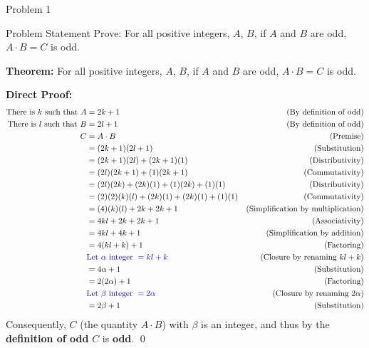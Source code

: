 \begin{problem}{Problem 1}
    \begin{statement}{Problem Statement}
        Prove: For all positive integers, $A$, $B$, if $A$ and $B$ are odd, $A \cdot B = C$ is odd.
    \end{statement}

    \begin{highlight}[Solution]
        \textbf{Theorem:} For all positive integers, $A$, $B$, if $A$ and $B$ are odd, $A \cdot B = C$ is odd. \vspace*{1em}

        \textbf{Direct Proof:} \newline
        \begin{align*}
            \text{There is $k$ such that } A & = 2k + 1 & \text{(By definition of odd)} \\
            \text{There is $l$ such that } B & = 2l + 1 & \text{(By definition of odd)} \\
            C & = A \cdot B & \text{(Premise)} \\
            & = (2k + 1)(2l + 1) & \text{(Substitution)} \\
            & = (2k + 1)(2l) + (2k + 1)(1) & \text{(Distributivity)} \\
            & = (2l)(2k + 1) + (1)(2k + 1) & \text{(Commutativity)} \\
            & = (2l)(2k) + (2k)(1) + (1)(2k) + (1)(1) & \text{(Distributivity)} \\
            & = (2)(2)(k)(l) + (2k)(1) + (2k)(1) + (1)(1) & \text{(Commutativity)} \\
            & = (4)(k)(l) + 2k + 2k + 1 & \text{(Simplification by multiplication)} \\
            & = 4kl + 2k + 2k + 1 & \text{(Associativity)} \\
            & = 4kl + 4k + 1 & \text{(Simplification by addition)} \\
            & = 4(kl + k) + 1 & \text{(Factoring)} \\
            & \textcolor{blue}{\text{Let } \alpha \text{ integer } = kl + k} & \text{(Closure by renaming $kl + k$)} \\
            & = 4\alpha + 1 & \text{(Substitution)} \\
            & = 2(2\alpha) + 1 & \text{(Factoring)} \\
            & \textcolor{blue}{\text{Let } \beta \text{ integer } = 2\alpha} & \text{(Closure by renaming $2\alpha$)} \\
            & = 2\beta + 1 & \text{(Substitution)} \\
        \end{align*}
        Consequently, $C$ (the quantity $A\cdot B$) with $\beta$ is an integer, and thus by the \textbf{definition of odd} $C$ is \textbf{odd}. \qed
    \end{highlight}
\end{problem}

